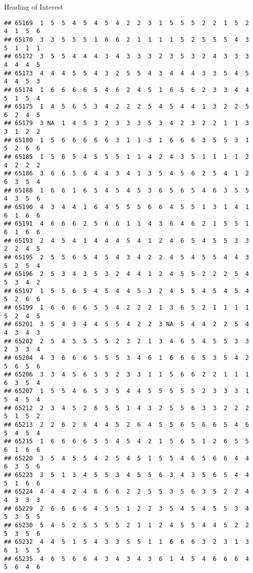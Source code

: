 \documentclass[
  ignorenonframetext,
]{beamer}
\begin{document}
\begin{frame}[fragile]{Heading of Interest}
\begin{verbatim}
## 65169  1  5  5  4  5  4  5  4  2  2  3  1  5  5  5  2  2  1  5  2  4  1  5  6
## 65170  3  3  5  5  5  1  6  6  2  1  1  1  1  5  2  5  5  5  4  3  5  1  1  1
## 65172  3  5  5  4  4  4  3  4  3  3  3  2  3  5  3  2  4  3  3  3  4  4  4  5
## 65173  4  4  4  5  5  4  3  2  5  5  4  3  4  4  4  3  3  5  4  5  4  4  5  3
## 65174  1  6  6  6  6  5  4  6  2  4  5  1  6  5  6  2  3  3  4  4  5  1  5  4
## 65175  1  4  5  6  5  3  4  2  2  2  5  4  5  4  4  1  3  2  2  5  6  2  4  5
## 65179  3 NA  1  4  5  3  2  3  3  3  5  3  4  2  3  2  2  1  1  3  3  1  2  2
## 65180  1  5  6  6  6  6  6  3  1  1  3  1  6  6  6  3  5  5  3  1  5  2  6  6
## 65185  1  5  6  5  4  5  5  5  1  1  4  2  4  3  5  1  1  1  1  2  4  2  2  2
## 65186  3  6  6  5  6  4  4  3  4  1  3  5  4  5  6  2  5  4  1  2  6  3  5  4
## 65188  1  6  6  1  6  5  4  5  4  5  3  6  5  6  5  4  6  3  5  5  4  3  5  6
## 65190  4  3  4  4  1  6  4  5  5  5  6  6  4  5  5  1  3  1  4  1  6  1  6  6
## 65191  4  6  6  6  2  5  6  6  1  1  4  3  6  4  6  2  1  5  5  1  6  1  6  6
## 65193  2  4  5  4  1  4  4  4  5  4  1  2  4  6  5  4  5  5  3  3  2  2  4  5
## 65195  2  5  5  6  5  4  5  4  3  4  2  2  4  5  4  5  5  4  4  3  5  2  5  4
## 65196  2  5  3  4  3  5  3  2  4  4  1  2  4  5  5  2  2  2  5  4  5  3  4  2
## 65197  1  5  5  6  5  4  5  4  4  5  3  2  4  5  5  4  5  4  5  4  5  2  6  6
## 65199  1  6  6  6  6  5  5  4  2  2  2  1  3  6  5  2  1  1  1  1  5  2  4  5
## 65201  3  5  4  3  4  4  5  5  4  2  2  3 NA  5  4  4  2  2  5  4  4  3  4  3
## 65202  2  5  4  5  5  5  5  2  3  2  1  3  4  6  5  4  5  5  3  3  2  3  3  4
## 65204  4  3  6  6  6  5  5  5  3  4  6  1  6  6  6  5  3  5  4  2  5  6  5  6
## 65206  3  3  4  5  6  5  5  2  3  3  1  1  5  6  6  2  2  1  1  1  6  3  5  4
## 65207  1  5  5  4  6  5  3  5  4  4  5  5  5  5  5  2  3  3  3  1  5  4  5  4
## 65212  2  3  4  5  2  6  5  5  1  4  3  2  5  5  6  3  3  2  2  2  5  1  5  2
## 65213  2  2  6  2  6  4  4  5  2  6  4  5  5  6  5  6  6  5  4  6  5  4  5  4
## 65215  1  6  6  6  6  5  5  4  5  4  2  1  5  6  5  1  2  6  5  5  6  1  6  6
## 65220  3  5  4  5  5  4  2  5  4  5  1  5  5  4  6  5  6  6  4  4  6  3  5  6
## 65223  3  5  1  3  4  5  5  3  4  5  5  6  3  4  3  5  6  5  4  4  5  1  6  6
## 65224  4  4  4  2  4  6  6  6  2  2  5  5  3  5  6  3  5  2  2  4  4  3  3  3
## 65229  2  6  6  6  6  4  5  5  1  2  2  3  5  4  5  4  5  5  3  4  5  3  5  5
## 65230  5  4  5  2  5  5  5  5  2  1  1  2  4  5  5  4  4  5  2  2  5  3  5  6
## 65232  4  4  5  1  5  4  3  3  5  5  1  1  6  6  6  3  2  3  1  3  6  1  5  5
## 65235  4  6  5  6  6  4  3  4  3  4  3  6  1  4  5  4  6  6  6  4  5  6  4  6

\end{verbatim}
\end{frame}
\end{document}
